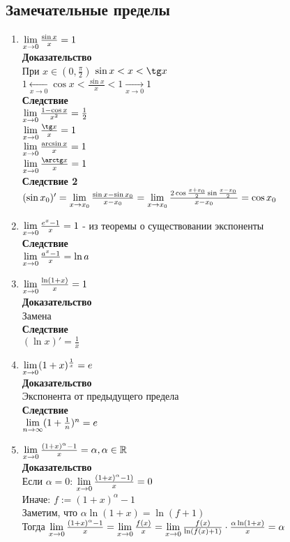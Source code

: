 \documentclass[12pt]{article}
\begin{document}
\subsection{Замечательные пределы}
\begin{enumerate}
    \item $\lim\limits_{x\rightarrow 0} \frac{\sin x}{x} = 1$\\
    \textbf{Доказательство}\\
    При $x \in (0, \frac{\pi}{2})$ $\sin x < x < \tg x$\\
    $1 \xleftarrow[x \rightarrow 0]{} \cos x < \frac{\sin x}{x} < 1 \xrightarrow[x \rightarrow 0]{} 1$\\
    \textbf{Следствие}\\
    $\lim\limits_{x\rightarrow 0} \frac{1-\cos x}{x^2} = \frac12$\\
    $\liml_{x\rightarrow 0} \frac{\tg x}{x} = 1$\\
    $\lim\limits_{x\rightarrow 0} \frac{\arcsin x}{x} = 1$\\
    $\liml_{x\rightarrow 0} \frac{\arctg x}{x} = 1$\\
    \textbf{Следствие 2}\\
    $(\sin x_0)' = \lim\limits_{x\rightarrow x_0} \frac{\sin x - \sin x_0}{x-x_0} = \lim\limits_{x\rightarrow x_0} \frac{2\cos \frac{x+x_0}{2}\sin \frac{x-x_0}{2}}{x-x_0} = \cos x_0$
    \item $\lim\limits_{x\rightarrow 0} \frac{e^x - 1}{x} = 1$ - из теоремы о существовании экспоненты\\
    \textbf{Следствие}\\
    $\lim\limits_{x\rightarrow 0} \frac{a^x-1}{x} = \ln a$
    \item $\lim\limits_{x\rightarrow 0} \frac{\ln (1+x)}{x} = 1$\\
    \textbf{Доказательство}\\
    Замена\\
    \textbf{Следствие}\\
    $(\ln x)' = \frac{1}{x}$
    \item $\lim\limits_{x\rightarrow 0} (1+x)^{\frac{1}{x}} = e$\\
    \textbf{Доказательство}\\
    Экспонента от предыдущего предела\\
    \textbf{Следствие}\\
    $\lim\limits_{n\rightarrow \infty} (1+\frac1n)^n = e$
    \item $\lim\limits_{x\rightarrow 0} \frac{(1+x)^\alpha - 1}{x} = \alpha, \alpha \in \mathbb{R}$\\
    \textbf{Доказательство}\\
    Если $\alpha = 0$: $\lim\limits_{x\rightarrow 0} \frac{(1+x)^\alpha - 1)}{x} = 0$\\
    Иначе: $f:= (1+x)^\alpha - 1$\\
    Заметим, что $\alpha \ln (1+x) = \ln(f+1)$\\
    Тогда $\lim\limits_{x\rightarrow 0} \frac{(1+x)^\alpha - 1}{x} = \lim\limits_{x\rightarrow 0} \frac{f(x)}{x} = \lim\limits_{x\rightarrow 0}\frac{f(x)}{\ln (f(x)+1)} \cdot \frac{\alpha \ln (1+x)}{x} = \alpha$
\end{enumerate}
\end{document}

